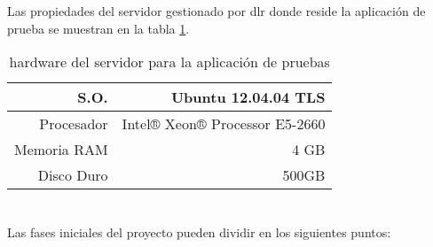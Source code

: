 Las propiedades del servidor gestionado por \gls{dlr} donde reside la aplicación de prueba se muestran en la tabla \ref{table:hardserv}.

\begin{center}
\begin {table}[H]
\centering
    \begin{tabular}{ | r | r |}
    \hline
    S.O.& Ubuntu 12.04.04 TLS \\ \hline
    Procesador & Intel® Xeon® Processor E5-2660 \\ \hline
    Memoria RAM & 4 GB \\ \hline
    Disco Duro & 500GB \\ \hline
    \end{tabular}
	\caption{\Gls{hardware} del servidor para la aplicación de pruebas}
    \label{table:hardserv}
  \end{table}
\end{center}

\section{}

\begin{comment}Definición del proceso de desarrollo, ciclo de vida y metodología empleada durante la elaboración del proyecto. Las fases y/o iteraciones que proponga el método empleado deberán quedar recogidas en la planificación que se detalle más adelante.
\end{comment}

Las fases iniciales del proyecto pueden dividir en los siguientes puntos:

